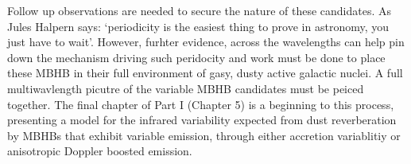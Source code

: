 Follow up observations are needed to secure the nature of these candidates. As
Jules Halpern says: `periodicity is the easiest thing to prove in astronomy,
you just have to wait'. However, furhter evidence, across the
wavelengths can help pin down the mechanism driving such peridocity and work
must be done to place these MBHB in their full environment of gasy, dusty
active galactic nuclei. A full multiwavlength picutre of the variable MBHB
candidates must be peiced together. The final chapter of Part I (Chapter 5) is
a beginning to this process, presenting a model for the infrared variability
expected from dust reverberation by MBHBs that exhibit variable emission,
through either accretion variablitiy or anisotropic Doppler boosted emission.


























